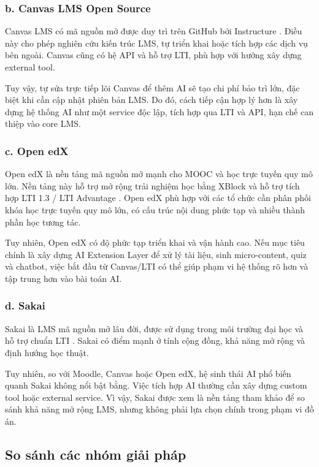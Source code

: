 \subsubsection*{b. Canvas LMS Open Source}

Canvas LMS có mã nguồn mở được duy trì trên GitHub bởi
Instructure \cite{canvas-oss}. Điều này cho phép nghiên cứu
kiến trúc LMS, tự triển khai hoặc tích hợp các dịch vụ bên ngoài. Canvas cũng
có hệ API và hỗ trợ LTI, phù hợp với hướng xây dựng external tool.

Tuy vậy, tự sửa trực tiếp lõi Canvas để thêm AI sẽ tạo chi phí bảo trì lớn, đặc
biệt khi cần cập nhật phiên bản LMS. Do đó, cách tiếp cận hợp lý hơn là xây
dựng hệ thống AI như một service độc lập, tích hợp qua LTI và API, hạn chế can
thiệp vào core LMS.

\subsubsection*{c. Open edX}

Open edX là nền tảng mã nguồn mở mạnh cho MOOC và học trực tuyến quy mô lớn.
Nền tảng này hỗ trợ mở rộng trải nghiệm học bằng XBlock và hỗ trợ tích hợp LTI
1.3 / LTI Advantage \cite{openedx-lti}. Open edX phù hợp với các tổ chức cần
phân phối khóa học trực tuyến quy mô lớn, có cấu trúc nội dung phức tạp và
nhiều thành phần học tương tác.

Tuy nhiên, Open edX có độ phức tạp triển khai và vận hành cao. Nếu mục tiêu
chính là xây dựng AI Extension Layer để xử lý tài liệu, sinh micro-content,
quiz và chatbot, việc bắt đầu từ Canvas/LTI có thể giúp phạm vi hệ thống rõ
hơn và tập trung hơn vào bài toán AI.

\subsubsection*{d. Sakai}

Sakai là LMS mã nguồn mở lâu đời, được sử dụng trong môi trường đại học và hỗ
trợ chuẩn LTI \cite{sakai-lms}. Sakai có điểm mạnh ở tính cộng đồng, khả
năng mở rộng và định hướng học thuật.

Tuy nhiên, so với Moodle, Canvas hoặc Open edX, hệ sinh thái AI phổ biến quanh
Sakai không nổi bật bằng. Việc tích hợp AI thường cần xây dựng custom tool hoặc
external service. Vì vậy, Sakai được xem là nền tảng tham khảo để so sánh khả
năng mở rộng LMS, nhưng không phải lựa chọn chính trong phạm vi đồ án.

\subsection{So sánh các nhóm giải pháp}

